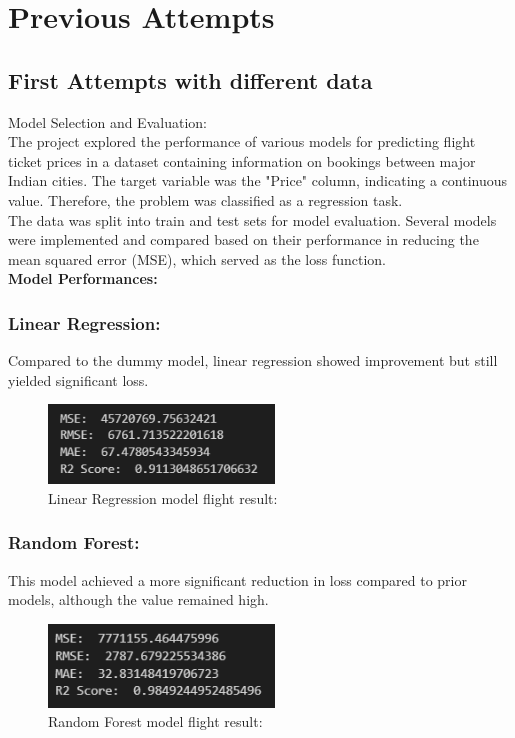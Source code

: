\documentclass{article}
\begin{document}
\newpage
\section{Previous Attempts}
\subsection{First Attempts with different data}
Model Selection and Evaluation:\\
The project explored the performance of various models for predicting flight ticket prices in a dataset containing information on bookings between major Indian cities. The target variable was the "Price" column, indicating a continuous value. Therefore, the problem was classified as a regression task.\\
The data was split into train and test sets for model evaluation. Several models were implemented and compared based on their performance in reducing the mean squared error (MSE), which served as the loss function.\\\newline
\textbf{Model Performances:}\\
\subsubsection{Linear Regression: }Compared to the dummy model, linear regression showed improvement but still yielded significant loss.
\begin{figure}[H]
    \caption{Linear Regression model flight result:}
    \centering
    \includegraphics[width=6cm]{../imgFolder/linearRegressionFlight.png}
\end{figure}

\subsubsection{Random Forest: }This model achieved a more significant reduction in loss compared to prior models, although the value remained high.
\begin{figure}[H]
    \caption{Random Forest model flight result:}
    \centering
    \includegraphics[width=6cm]{../imgFolder/randomForestFlight.png}
\end{figure}
\end{document}
